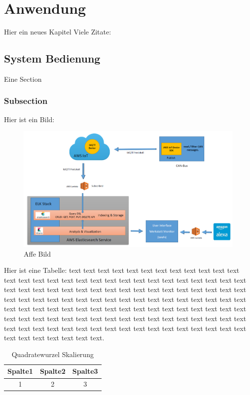 \chapter{Anwendung}
    Hier ein neues Kapitel
    Viele Zitate: \cite{patterson} \cite{krizhevsky} \cite{matlab} \cite{pitts} \cite{lawrence} \cite{miesbach}
    \section{System Bedienung}
        Eine Section
        \subsection{Subsection}
        
        
Hier ist ein Bild:        
            \begin{figure}[h]
                \includegraphics[scale=0.2]{Abbildungen/Kapitel4/Big-architecture.png}
                \centering
                \caption{Affe Bild}
                \label{Abb:Affe}   
            \end{figure}  
            
Hier ist eine Tabelle: text text text text text text text text text text text text text text text text text text text text text text text text text text text text text text text text text text text text text text text text text text text text text text text text text text text text text text text text text text text text text text text text text text text text text text text text text text text text text text text text text text text text text text text text text text text text text text text text text text text text text text text text text text text text text text text text text text text text text text text text text.           
            
             \begin{table}[h]
                \begin{tabular}{ccc}
                      \hline
                      Spalte1 & Spalte2 & Spalte3\\                      
                      \hline
                      1 & 2 & 3\\
                      \hline
                \end{tabular}
                \centering
                \caption{Quadratewurzel Skalierung}
                \label{Tab:Quadratewurzel Skalierung}
            \end{table}
            
